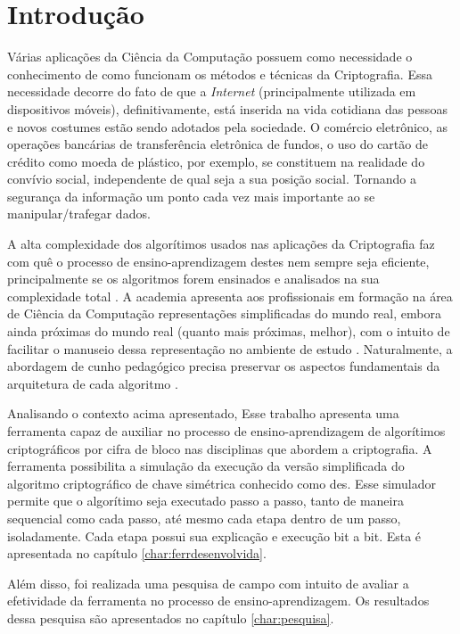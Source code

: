 \chapter{Introdução}
\label{char:intro}
Várias aplicações da Ciência da Computação possuem como necessidade o conhecimento de como funcionam os métodos e técnicas da Criptografia. Essa necessidade decorre do fato de que a \textit{Internet} (principalmente utilizada em dispositivos móveis), definitivamente, está inserida na vida cotidiana das pessoas e novos costumes estão sendo adotados pela sociedade. O comércio eletrônico, as operações bancárias de transferência eletrônica de fundos, o uso do cartão de crédito como moeda de plástico, por exemplo, se constituem na realidade do convívio social, independente de qual seja a sua posição social. Tornando a segurança da informação um ponto cada vez mais importante ao se manipular/trafegar dados.\cite{silva09} \cite{silva12}

A alta complexidade dos algorítimos usados nas aplicações da Criptografia faz com quê o processo de ensino-aprendizagem destes nem sempre seja eficiente, principalmente se os algoritmos forem ensinados e analisados na sua complexidade total \cite{silva09} \cite{silva12}. A academia apresenta aos profissionais em formação na área de Ciência da Computação representações simplificadas do mundo real, embora ainda próximas do mundo real (quanto mais próximas, melhor), com o intuito de facilitar o manuseio dessa representação no ambiente de estudo \cite{maia01} \cite{maia03} \cite{kioki08}. Naturalmente, a abordagem de cunho pedagógico precisa preservar os aspectos fundamentais da arquitetura de cada algoritmo \cite{garmpis11} \cite{lopes12}.

Analisando o contexto acima apresentado, Esse trabalho apresenta uma ferramenta capaz de auxiliar no processo de ensino-aprendizagem de algorítimos criptográficos por cifra de bloco nas disciplinas que abordem a criptografia. A ferramenta possibilita a simulação da execução da versão simplificada do algoritmo criptográfico de chave simétrica conhecido como \acrfull{des}. Esse simulador permite que o algorítimo seja executado passo a passo, tanto de maneira sequencial como cada passo, até mesmo cada etapa dentro de um passo, isoladamente. Cada etapa possui sua explicação e execução bit a bit. Esta é apresentada no capítulo \ref{char:ferrdesenvolvida}.

Além disso, foi realizada uma pesquisa de campo com intuito de avaliar a efetividade da ferramenta no processo de ensino-aprendizagem. Os resultados dessa pesquisa são apresentados no capítulo \ref{char:pesquisa}.
